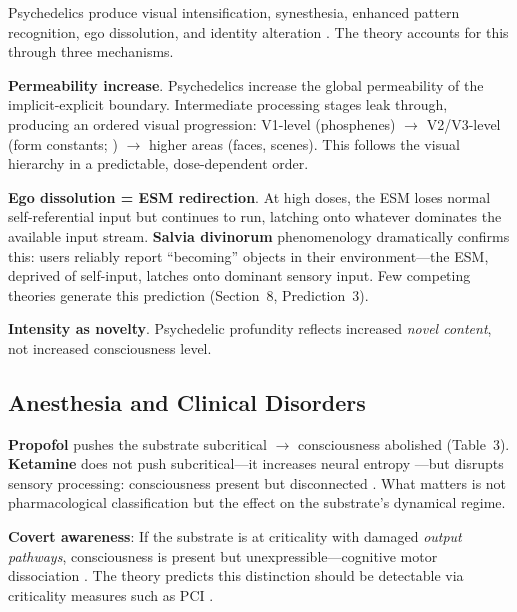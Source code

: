 \documentclass[12pt]{article}
\begin{document}
Psychedelics produce visual intensification, synesthesia, enhanced pattern recognition, ego dissolution, and identity alteration \citep{CarhartHarris2012,CarhartHarris2016,Timmermann2019,Timmermann2023}. The theory accounts for this through three mechanisms.

\textbf{Permeability increase}. Psychedelics increase the global permeability of the implicit-explicit boundary. Intermediate processing stages leak through, producing an ordered visual progression: V1-level (phosphenes) $\to$ V2/V3-level (form constants; \citealp{Kluver1966}) $\to$ higher areas (faces, scenes). This follows the visual hierarchy in a predictable, dose-dependent order.

\textbf{Ego dissolution = ESM redirection}. At high doses, the ESM loses normal self-referential input but continues to run, latching onto whatever dominates the available input stream. \textbf{Salvia divinorum} phenomenology dramatically confirms this: users reliably report ``becoming'' objects in their environment---\hspace{0pt}the ESM, deprived of self-input, latches onto dominant sensory input. Few competing theories generate this prediction (Section~8, Prediction~3).

\textbf{Intensity as novelty}. Psychedelic profundity reflects increased \emph{novel content}, not increased consciousness level.


\subsection{Anesthesia and Clinical Disorders}

\textbf{Propofol} pushes the substrate subcritical $\to$ consciousness abolished (Table~3). \textbf{Ketamine} does not push subcritical---\hspace{0pt}it increases neural entropy \citep{Schartner2017}---\hspace{0pt}but disrupts sensory processing: consciousness present but disconnected \citep{Corlett2011}. What matters is not pharmacological classification but the effect on the substrate's dynamical regime.

\textbf{Covert awareness}: If the substrate is at criticality with damaged \emph{output pathways}, consciousness is present but unexpressible---\hspace{0pt}cognitive motor dissociation \citep{Owen2006,Monti2010}. The theory predicts this distinction should be detectable via criticality measures such as PCI \citep{Casali2013,Casarotto2016}.
\end{document}

